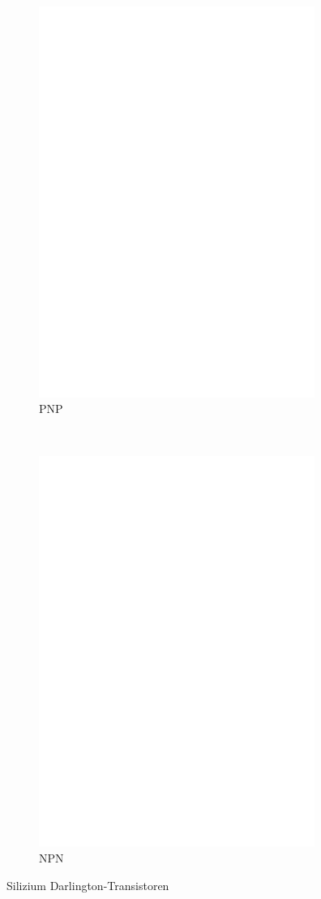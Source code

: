 \begin{figure}[H]
  \begin{subfigure}[b]{9cm}
    \centering
    \includegraphics[width=9cm]{../FIG/BJT_BDV64.eps}
    \caption{PNP}
    \label{fig:BJT-PNP-Darl-R-D}
  \end{subfigure}
  ~
  \begin{subfigure}[b]{9cm}
    \centering
    \includegraphics[width=9cm]{../FIG/BJT_BDV65.eps}
    \caption{NPN}
    \label{fig:BJT-NPN-Darl-R-D}
  \end{subfigure}
  \caption{Silizium Darlington-Transistoren}
\end{figure}
